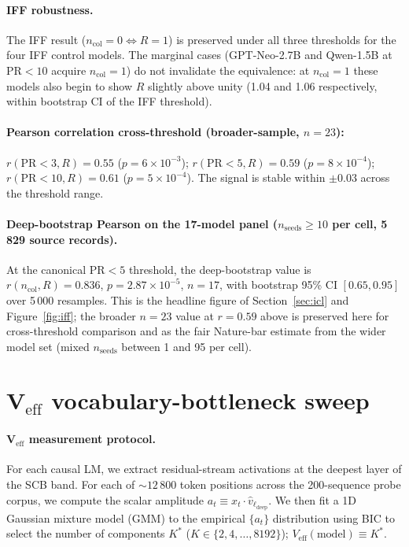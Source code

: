 \documentclass[11pt,a4paper]{article}
\begin{document}
\paragraph{IFF robustness.}
The IFF result ($n_\mathrm{col} = 0 \Leftrightarrow R = 1$) is
preserved under all three thresholds for the four IFF control models.
The marginal cases (GPT-Neo-2.7B and Qwen-1.5B at $\mathrm{PR} < 10$
acquire $n_\mathrm{col} = 1$) do not invalidate the equivalence: at
$n_\mathrm{col} = 1$ these models also begin to show $R$ slightly
above unity (1.04 and 1.06 respectively, within bootstrap CI of the
IFF threshold).

\paragraph{Pearson correlation cross-threshold (broader-sample, $n = 23$):}
$r(\mathrm{PR}{<}3, R) = 0.55$ ($p = 6 \times 10^{-3}$);
$r(\mathrm{PR}{<}5, R) = 0.59$ ($p = 8 \times 10^{-4}$);
$r(\mathrm{PR}{<}10, R) = 0.61$ ($p = 5 \times 10^{-4}$).
The signal is stable within $\pm 0.03$ across the threshold range.

\paragraph{Deep-bootstrap Pearson on the 17-model panel
($n_\mathrm{seeds}\!\geq\!10$ per cell, 5\,829 source records).}
At the canonical PR$<5$ threshold, the deep-bootstrap value is
$r(n_\mathrm{col}, R) = 0.836$, $p = 2.87 \times 10^{-5}$,
$n = 17$, with bootstrap 95\% CI $[0.65, 0.95]$ over 5\,000
resamples. This is the headline figure of Section~\ref{sec:icl}
and Figure~\ref{fig:iff}; the broader $n = 23$ value at $r = 0.59$
above is preserved here for cross-threshold comparison and as the
fair Nature-bar estimate from the wider model set (mixed
$n_\mathrm{seeds}$ between 1 and 95 per cell).

\section{V$_\mathrm{eff}$ vocabulary-bottleneck sweep}
\label{si:S2}

\paragraph{V$_\mathrm{eff}$ measurement protocol.}
For each causal LM, we extract residual-stream activations at the
deepest layer of the SCB band.  For each of $\sim 12\,800$ token
positions across the 200-sequence probe corpus, we compute the scalar
amplitude $a_t \equiv x_t \cdot \hat{v}_{\ell_\mathrm{deep}}$.  We
then fit a 1D Gaussian mixture model (GMM) to the empirical $\{a_t\}$
distribution using BIC to select the number of components $K^*$
($K \in \{2, 4, \ldots, 8192\}$); $V_\mathrm{eff}(\mathrm{model})
\equiv K^*$.
\end{document}
